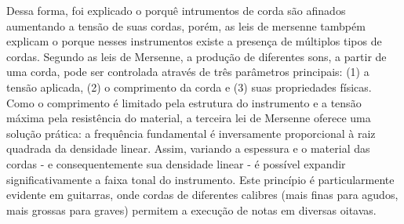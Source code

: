Dessa forma, foi explicado o porquê intrumentos de corda são afinados aumentando a tensão de suas cordas, porém, as leis de mersenne tambpém explicam o porque nesses instrumentos existe a presença de múltiplos tipos de cordas. Segundo as leis de Mersenne, a produção de diferentes sons, a partir de uma corda, pode ser controlada através de três parâmetros principais: (1) a tensão aplicada, (2) o comprimento da corda e (3) suas propriedades físicas. Como o comprimento é limitado pela estrutura do instrumento e a tensão máxima pela resistência do material, a terceira lei de Mersenne oferece uma solução prática: a frequência fundamental é inversamente proporcional à raiz quadrada da densidade linear. Assim, variando a espessura e o material das cordas - e consequentemente sua densidade linear - é possível expandir significativamente a faixa tonal do instrumento. Este princípio é particularmente evidente em guitarras, onde cordas de diferentes calibres (mais finas para agudos, mais grossas para graves) permitem a execução de notas em diversas oitavas.

